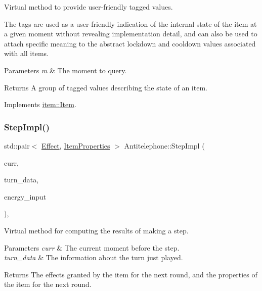 Virtual method to provide user-\/friendly tagged values. 

The tags are used as a user-\/friendly indication of the internal state of the item at a given moment without revealing implementation detail, and can also be used to attach specific meaning to the abstract lockdown and cooldown values associated with all items. 
\begin{DoxyParams}{Parameters}
{\em m} & The moment to query. \\
\hline
\end{DoxyParams}
\begin{DoxyReturn}{Returns}
A group of tagged values describing the state of an item. 
\end{DoxyReturn}


Implements \hyperlink{classitem_1_1_item_a8410ab3ab75e65360eddb4f6bd3cceff}{item\+::\+Item}.

\mbox{\label{classitem_1_1_antitelephone_aa59b4569bac948f37fd15dbea234503f}} 
\subsubsection{\texorpdfstring{Step\+Impl()}{StepImpl()}}
{\footnotesize\ttfamily std\+::pair$<$ \hyperlink{classitem_1_1_effect}{Effect}, \hyperlink{classitem_1_1_item_properties}{Item\+Properties} $>$ Antitelephone\+::\+Step\+Impl (\begin{DoxyParamCaption}\item[{\hyperlink{classtimeplane_1_1_moment}{Moment}}]{curr,  }\item[{\hyperlink{classroundinfo_1_1_round_info_view}{Round\+Info\+View} const \&}]{turn\+\_\+data,  }\item[{int}]{energy\+\_\+input }\end{DoxyParamCaption})\hspace{0.3cm}{\ttfamily [protected]}, {\ttfamily [virtual]}}



Virtual method for computing the results of making a step. 


\begin{DoxyParams}{Parameters}
{\em curr} & The current moment before the step. \\
\hline
{\em turn\+\_\+data} & The information about the turn just played. \\
\hline
\end{DoxyParams}
\begin{DoxyReturn}{Returns}
The effects granted by the item for the next round, and the properties of the item for the next round. 
\end{DoxyReturn}


